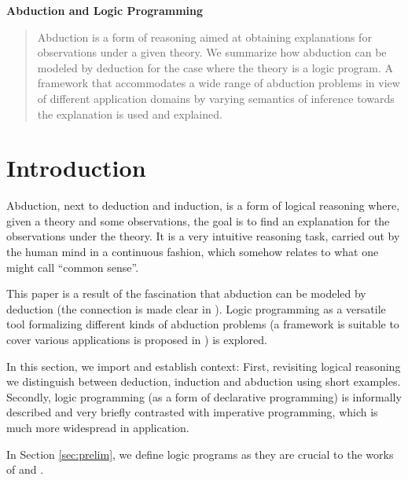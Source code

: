 \documentclass[a4paper]{article}
\begin{document}
\begin{center}

{\bfseries\Large{Abduction and Logic Programming}\\[3mm]}

\end{center}
\begin{abstract}
Abduction is a form of reasoning aimed at obtaining explanations for observations under a given theory. We summarize how abduction can be modeled by deduction for the case where the theory is a logic program. A framework that accommodates a wide range of abduction problems in view of different application domains by varying semantics of inference towards the explanation is used and explained.
\end{abstract}

\section{Introduction}
\label{intro}

Abduction, next to deduction and induction, is a form of logical reasoning where, given a theory and some observations, the goal is to find an explanation for the observations under the theory. It is a very intuitive reasoning task, carried out by the human mind in a continuous fashion, which somehow relates to what one might call \enquote{common sense}.

This paper is a result of the fascination that abduction can be modeled by deduction (the connection is made clear in \cite{DBLP:journals/logcom/ConsoleDT91}). Logic programming as a versatile tool formalizing different kinds of abduction problems (a framework is suitable to cover various applications is proposed in \cite{DBLP:journals/tcs/EiterGL97}) is explored.

In this section, we import and establish context: First, revisiting logical reasoning we distinguish between deduction, induction and abduction using short examples. Secondly, logic programming (as a form of declarative programming) is informally described and very briefly contrasted with imperative programming, which is much more widespread in application.

In Section \ref{sec:prelim}, we define logic programs as they are crucial to the works of \citet{DBLP:journals/logcom/ConsoleDT91} and \citet{DBLP:journals/tcs/EiterGL97}.
\end{document}
